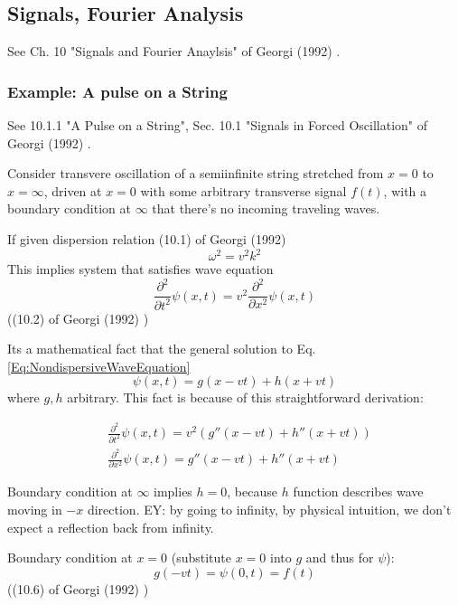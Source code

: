 \documentclass[10pt]{amsart}
\begin{document}
\begin{multicols*}{2}
\subsection{Signals, Fourier Analysis}

See Ch. 10 "Signals and Fourier Anaylsis" of Georgi (1992) \cite{Geor1992}.

\subsubsection{Example: A pulse on a String}

See 10.1.1 "A Pulse on a String", Sec. 10.1 "Signals in Forced Oscillation" of Georgi (1992) \cite{Geor1992}.

Consider transvere oscillation of a semiinfinite string stretched from $x=0$ to $x=\infty$, driven at $x=0$ with some arbitrary transverse signal $f(t)$, with a boundary condition at $\infty$ that there's no incoming traveling waves.

If given dispersion relation (10.1) of Georgi (1992) \cite{Geor1992}
\begin{equation}\label{Eq:NondispersiveDispersionRelation}
	\omega^2 = v^2 k^2
\end{equation}
This implies system that satisfies wave equation
\begin{equation}\label{Eq:NondispersiveWaveEquation}
	\frac{\partial^2}{\partial t^2} \psi(x,t) = v^2 \frac{\partial^2}{\partial x^2} \psi(x,t)
\end{equation}
((10.2) of Georgi (1992) \cite{Geor1992})

Its a mathematical fact that the general solution to Eq. \ref{Eq:NondispersiveWaveEquation} 
\begin{equation}
	\psi(x,t) = g(x- vt) + h(x+vt)
\end{equation}
where $g,h $ arbitrary. This fact is because of this straightforward derivation:

\[
\begin{aligned}
& \frac{\partial^2}{ \partial t^2} \psi(x,t) = v^2 (g''(x-vt) + h''(x+vt)) \\
&	\frac{\partial^2}{ \partial x^2} \psi(x,t) = g''(x-vt) + h''(x+vt)
\end{aligned}
\]

Boundary condition at $\infty$ implies $h=0$, because $h$ function describes wave moving in $-x$ direction. EY: by going to infinity, by physical intuition, we don't expect a reflection back from infinity.

Boundary condition at $x=0$ (substitute $x=0$ into $g$ and thus for $\psi$):
\begin{equation}
	g(-vt) = \psi(0,t) = f(t)
\end{equation}
((10.6) of Georgi (1992) \cite{Geor1992})


\end{multicols*}
\end{document}
